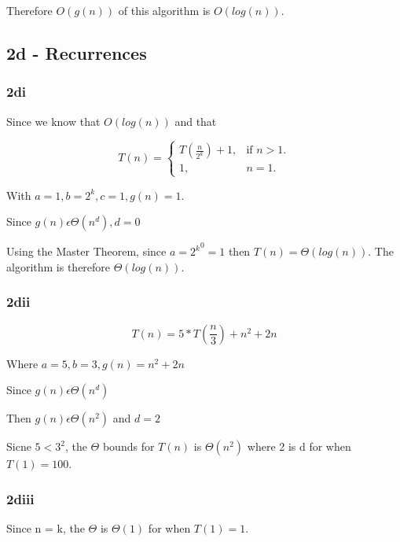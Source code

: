 \documentclass[oneside, a4paper]{article}
\begin{document}
Therefore $O(g(n))$ of this algorithm is $O(log(n))$.

\subsection*{2d - Recurrences}

\subsubsection*{2di}
Since we know that $O(log(n))$ and that 

\begin{equation}
    T(n)=\begin{cases}
        T(\frac{n}{2^k}) + 1, & \text{if $n>1$}.\\
        1, & \text{$n = 1$}.
    \end{cases}
\end{equation}

With $a = 1, b = 2^k, c = 1, g(n) = 1$. 

Since $g(n) \epsilon \Theta(n^d), d = 0$

Using the Master Theorem, since $a = {2^k}^0 = 1$ then $T(n) = \Theta(log(n))$. The algorithm is therefore $\Theta(log(n))$. 

\subsubsection*{2dii}
\begin{center}
    $$T(n) = 5 * T (\frac{n}{3}) + n^2 + 2n$$

    Where $a = 5, b = 3, g(n) = n^2 + 2n$

    Since $g(n) \epsilon \Theta(n^d)$ 

    Then $g(n) \epsilon \Theta(n^2)$ and $d = 2$

    Sicne $5 < 3^2$, the $\Theta$ bounds for $T(n)$ is $\Theta(n^2)$ where 2 is d for when $T(1) = 100$.
\end{center}


\subsubsection*{2diii}
Since n = k, the $\Theta$ is  $\Theta(1)$ for when $T(1) = 1$.
\end{document}
